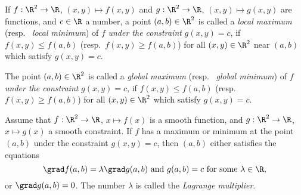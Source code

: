 \begin{definition}
   If $f:\R^2 \rightarrow \R$, $(x,y)\mapsto f(x,y)$ and $g :\R^2 \rightarrow \R$, $(x,y)\mapsto g(x,y)$ 
   are functions, and $c\in \R$ a number, a point $(a,b) \in \R^2$ is called
   a \emph{local maximum} (resp.~ \emph{local minimum}) of $f$ \emph{under the constraint} $g(x,y)=c$, if
   $f(x,y)\leq f(a,b)$ (resp.~$f(x,y)\geq f(a,b)$) for all $(x,y)\in \R^2$ near $(a,b)$ 
   which satisfy $g(x,y)=c$.

   The point $(a,b)\in \R^2$ is called a \emph{global maximum} (resp.~ \emph{global minimum}) of $f$
   \emph{under the constraint} $g(x,y)=c$, if $f(x,y)\leq f(a,b)$ (resp.~$f(x,y)\geq f(a,b)$) for all 
   $(x,y)\in \R^2$  which satisfy $g(x,y)=c$.
\end{definition}

\begin{theorem}
  Assume that $f:\R^2 \rightarrow \R$, $x\mapsto f(x)$ is a smooth function, and 
  $g:\R^2 \rightarrow \R$, $x\mapsto g(x)$ a smooth constraint. 
  If $f$ has a maximum or minimum at the point $(a,b)$ under the constraint $g(x,y)=c$, 
  then $(a,b)$ either satisfies the equations
  \[
     \grad f (a,b) = \lambda \grad g (a,b) \text{ and } g(a,b)=c \text{ for some $\lambda \in \R$},
  \]
  or $\grad g (a,b)=0$.  The number $\lambda$ is called the \emph{Lagrange multiplier}.
\end{theorem}
